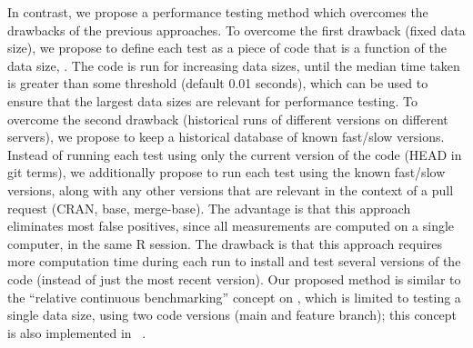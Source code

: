 In contrast, we propose a performance testing method which overcomes the drawbacks of the previous approaches.
To overcome the first drawback (fixed data size), we propose to define each test as a piece of code that is a function of the data size, . 
The code is run for increasing data sizes, until the median time taken is greater than some threshold (default 0.01 seconds), which can be used to ensure that the largest data sizes are relevant for performance testing.
To overcome the second drawback (historical runs of different versions on different servers), we propose to keep a historical database of known fast/slow versions.
Instead of running each test using only the current version of the code (HEAD in git terms), we additionally propose to run each test using the known fast/slow versions, along with any other versions that are relevant in the context of a pull request (CRAN, base, merge-base).
The advantage is that this approach eliminates most false positives, since all measurements are computed on a single computer, in the same R session.
The drawback is that this approach requires more computation time during each run to install and test several versions of the code (instead of just the most recent version). 
Our proposed method is similar to the ``relative continuous benchmarking'' concept on  \citep{bencher}, which is limited to testing a single data size, using two code versions (main and feature branch); this concept is also implemented in 
~\citep{touchstone}.

